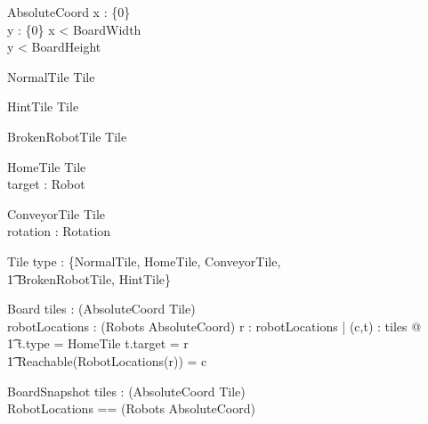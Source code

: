 \documentclass[12pt]{article}
\begin{document}
\begin{schema}{AbsoluteCoord}
x : \nat \cup \{0\} \\
y : \nat \cup \{0\}
\where
x < BoardWidth \\
y < BoardHeight
\end{schema}


\begin{schema}{NormalTile}
Tile
\end{schema}

\begin{schema}{HintTile}
Tile
\end{schema}

\begin{schema}{BrokenRobotTile}
Tile
\end{schema}

\begin{schema}{HomeTile}
Tile \\
target : Robot
\end{schema}

\begin{schema}{ConveyorTile}
Tile \\
rotation : Rotation
\end{schema}

\begin{schema}{Tile}
type : \{NormalTile, HomeTile, ConveyorTile, \\ \t1 BrokenRobotTile, HintTile\}
\end{schema}

\begin{schema}{Board}
tiles : \power (AbsoluteCoord \fun Tile) \\
robotLocations : \power (Robots \fun AbsoluteCoord)
\where
\forall r : \dom robotLocations | \exists (c,t) : tiles @  \\ \t1 t.type = HomeTile \wedge t.target = r \wedge \\ \t1 Reachable(RobotLocations(r)) = c
\end{schema}

\begin{schema}{BoardSnapshot}
tiles : \power (AbsoluteCoord \fun Tile) \\
RobotLocations == \power (Robots \fun AbsoluteCoord)
\end{schema}
\end{document}
